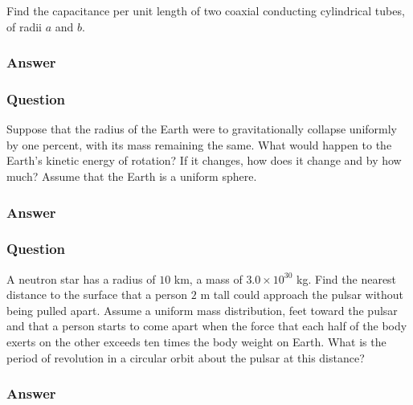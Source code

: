 Find the capacitance per unit length of two coaxial conducting cylindrical tubes, of radii $a$ and $b$.

\subsubsection{Answer}


\subsubsection{Question}
Suppose that the radius of the Earth were to gravitationally collapse uniformly by one percent, with its mass remaining the same. What would happen to the Earth’s kinetic energy of rotation? If it changes, how does it change and by how much? Assume that the Earth is a uniform sphere.
\subsubsection{Answer}


\subsubsection{Question}
A neutron star has a radius of $10$ km, a mass of $3.0\times10^{30}$ kg. Find the nearest distance to the surface that a person $2$ m tall could approach the pulsar without being pulled apart. Assume a uniform mass distribution, feet toward the pulsar and that a person starts to come apart when the force that each half of the body exerts on the other exceeds ten times the body weight on Earth. What is the period of revolution in a circular orbit about the pulsar at this distance?
\subsubsection{Answer}


